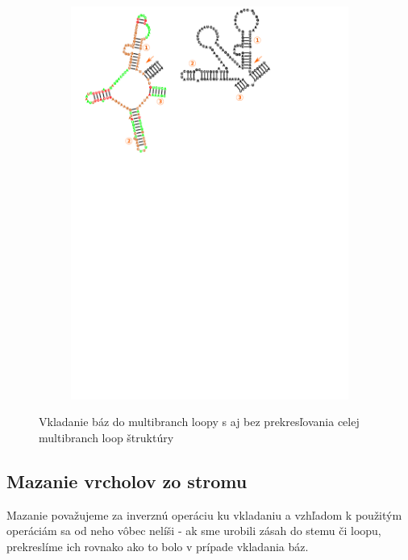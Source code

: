 \begin{figure}[t!]
\begin{subfigure}[t]{\wi}
    \includegraphics[clip, trim=1cm 18cm 13cm 0, width=1\textwidth]{../img/alg/insert/multibranch-redraw}
  \end{subfigure}

  \caption{Vkladanie báz do multibranch loopy s aj bez prekresľovania celej multibranch loop štruktúry}
  \label{obr:insert_multibranch}
\end{figure}





\subsection{Mazanie vrcholov zo stromu}

Mazanie považujeme za inverznú operáciu ku vkladaniu a vzhľadom k použitým operáciám
sa od neho vôbec nelíši - ak sme urobili zásah do stemu či loopu, prekreslíme
ich rovnako ako to bolo v prípade vkladania báz.




